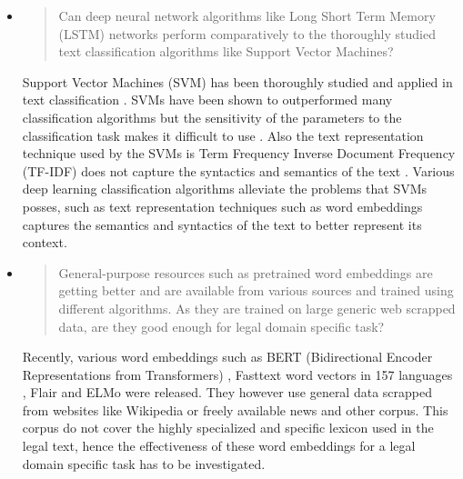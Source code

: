 \begin{itemize}
    \item 
        \begin{quote}
        Can deep neural network algorithms like Long Short Term Memory (LSTM) networks perform comparatively to the thoroughly studied text classification algorithms like Support Vector Machines?
        \end{quote}
        
        Support Vector Machines (SVM) has been thoroughly studied and applied in text classification \cite{Chau:2008:MLA:1322568.1322643, Fan:2006:ITM:1217741.1217764, Forman:2008:BFS:1458082.1458119,10.1007/BFb0026683,Sebastiani:2002:MLA:505282.505283,oro15675}. SVMs have been shown  to outperformed many classification algorithms but the sensitivity of the parameters to the classification task makes it difficult to use \cite{10.1007/978-0-387-34747-9_18}. Also the text representation technique used by the SVMs is Term Frequency Inverse Document Frequency (TF-IDF) does not capture the syntactics and semantics of the text \cite{Corr_a_J_nior_2017}. Various deep learning classification algorithms alleviate the problems that SVMs posses, such as text representation techniques such as word embeddings captures the semantics and syntactics of the text to better represent its context.
        
        
    \item 
    \begin{quote}
        General-purpose resources such as pretrained word embeddings are getting better and are available from various sources and trained using different algorithms. As they are trained on large generic web scrapped data, are they good enough for legal domain specific task?    
    \end{quote}
    Recently, various word embeddings such as BERT (Bidirectional Encoder Representations from Transformers) \cite{devlin2018bert}, Fasttext word vectors in 157 languages \cite{bojanowski2017enriching}, Flair \cite{akbik2018coling} and ELMo \cite{Peters:2018} were released. They however use general data scrapped from websites like Wikipedia or freely available news and other corpus. This corpus do not cover the highly specialized and specific lexicon used in the legal text, hence the effectiveness of these word embeddings for a legal domain specific task has to be investigated.
    

\end{itemize}
